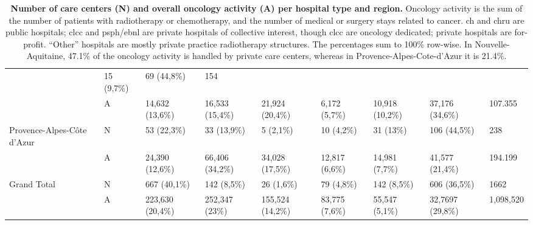 \begin{table}[H]
{\begin{tabular}{|l|l|l|l|l|l|l|l|l|}
                                                              & 15 (9,7\%)      & 69 (44,8\%)                                 & 154                                                                      \\
            ~                                                 & A               & 14,632 (13,6\%)                             & 16,533 (15,4\%) & 21,924 (20,4\%)  & 6,172
            (5,7\%)                                           & 10,918 (10,2\%) & 37,176 (34,6\%)                             & 107.355                                                                  \\ \hline
            Provence-Alpes-Côte d'Azur                        & N               & 53 (22,3\%)                                 & 33 (13,9\%)     & 5 (2,1\%)        &
            10 (4,2\%)                                        & 31 (13\%)       & 106 (44,5\%)                                & 238                                                                      \\
            ~                                                 & A               & 24,390 (12,6\%)                             & 66,406 (34,2\%) & 34,028 (17,5\%)  & 12,817
            (6,6\%)                                           & 14,981 (7,7\%)  & 41,577 (21,4\%)                             & 194.199                                                                  \\ \hline
            Grand Total                                       & N               & 667 (40,1\%)                                & 142 (8,5\%)     & 26 (1,6\%)       & 79 (4,8\%)     &
            142 (8,5\%)                                       & 606 (36,5\%)    & 1662                                                                                                                   \\
            ~                                                 & A               & 223,630 (20,4\%)                            & 252,347 (23\%)  & 155,524 (14,2\%) & 83,775
            (7,6\%)                                           & 55,547 (5,1\%)  & 32,7697 (29,8\%)                            & 1,098,520                                                                \\ \hline
        \end{tabular}} \caption{ \textbf{Number of care centers (N) and overall
            oncology activity (A) per hospital type and region.} Oncology activity is
        the sum of the number of patients with radiotherapy or chemotherapy, and the
        number of medical or surgery stays related to cancer. \ac{ch} and \ac{chru}
        are public hospitals; \ac{clcc} and \ac{psph}/\ac{ebnl} are private
        hospitals of collective interest, though \acs{clcc} are oncology dedicated;
        private hospitals are for-profit. “Other” hospitals are mostly private
        practice radiotherapy structures. The percentages sum to 100\% row-wise. In
        Nouvelle-Aquitaine, 47.1\% of the oncology activity is handled by private
        care centers, whereas in Provence-Alpes-Cote-d'Azur it is 21.4\%. }
    \label{table:oncology-activity-per-region}
\end{table}

